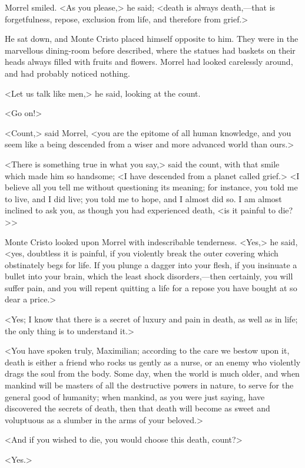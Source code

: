  Morrel smiled. <As you please,> he said; <death is always death,—that is forgetfulness, repose, exclusion from life, and therefore from grief.> 

 He sat down, and Monte Cristo placed himself opposite to him. They were in the marvellous dining-room before described, where the statues had baskets on their heads always filled with fruits and flowers. Morrel had looked carelessly around, and had probably noticed nothing. 

 <Let us talk like men,> he said, looking at the count. 

 <Go on!> 

 <Count,> said Morrel, <you are the epitome of all human knowledge, and you seem like a being descended from a wiser and more advanced world than ours.> 

 <There is something true in what you say,> said the count, with that smile which made him so handsome; <I have descended from a planet called grief.>  <I believe all you tell me without questioning its meaning; for instance, you told me to live, and I did live; you told me to hope, and I almost did so. I am almost inclined to ask you, as though you had experienced death, <is it painful to die?>> 

 Monte Cristo looked upon Morrel with indescribable tenderness. <Yes,> he said, <yes, doubtless it is painful, if you violently break the outer covering which obstinately begs for life. If you plunge a dagger into your flesh, if you insinuate a bullet into your brain, which the least shock disorders,—then certainly, you will suffer pain, and you will repent quitting a life for a repose you have bought at so dear a price.> 

 <Yes; I know that there is a secret of luxury and pain in death, as well as in life; the only thing is to understand it.> 

 <You have spoken truly, Maximilian; according to the care we bestow upon it, death is either a friend who rocks us gently as a nurse, or an enemy who violently drags the soul from the body. Some day, when the world is much older, and when mankind will be masters of all the destructive powers in nature, to serve for the general good of humanity; when mankind, as you were just saying, have discovered the secrets of death, then that death will become as sweet and voluptuous as a slumber in the arms of your beloved.> 

 <And if you wished to die, you would choose this death, count?> 

 <Yes.> 

